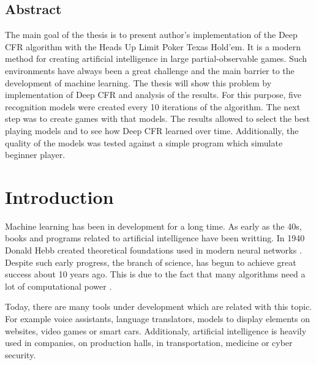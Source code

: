 \documentclass[12pt,oneside,a4paper]{report}
\begin{document}




\vspace{2cm}
\section*{Abstract}

The main goal of the thesis is to present author's implementation of the Deep CFR algorithm with the
Heads Up Limit Poker Texas Hold'em. It is a modern method for creating artificial intelligence in large partial-observable games. Such environments
have always been a great challenge and the main barrier to the development of machine learning. The thesis will show this problem by implementation of Deep CFR and analysis of the results.
For this purpose, five recognition models were created every 10 iterations of the algorithm. 
The next step was to create games with that models. The results allowed to select the best playing models and to see how Deep CFR learned over time.
Additionally, the quality of the models was tested against a simple program which simulate beginner player.




\tableofcontents{}
\newpage

\setlength{\parindent}{0.5em}
\setlength{\parskip}{0.5em}
\renewcommand{\baselinestretch}{1.5}



\chapter{Introduction}

Machine learning has been in development for a long time.
As early as the 40s, books and programs related to artificial intelligence \cite{hist AI}
have been writting. 
In 1940 Donald Hebb created theoretical foundations used in 
modern neural networks \cite{hist AI}. Despite such early progress, the branch of
science,
has begun to achieve great success about 10 years ago. This is due to the fact that many algorithms
need
a lot of computational power \cite{hist AI}.  

Today, there are many tools under development which are related with this topic.
For example voice assistants, language translators, models to display elements on
websites, video games or smart cars.
Additionaly, artificial intelligence is heavily used in companies,
on production halls, in transportation, medicine or cyber security. 
\end{document}
